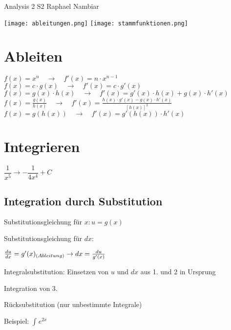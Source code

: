 



\begin{multicols*}{3}

    \DocumentInfo
    {Analysis 2 S2} %
    {Raphael Nambiar} %





    \texttt{[image: ableitungen.png]}
    \texttt{[image: stammfunktionen.png]}

    \section{ Ableiten }

    $f(x) = x^n \quad \rightarrow \quad f'(x) = n \cdot x^{n-1}$
    \WhiteSpace
    $f(x) = c \cdot g(x) \quad \rightarrow \quad f'(x) = c \cdot g'(x)$
    \WhiteSpace
    $f(x) = g(x) \cdot h(x) \quad \rightarrow \quad f'(x) = g'(x) \cdot h(x) + g(x) \cdot h'(x)$
    \WhiteSpace
    $f(x) = \frac{g(x)}{h(x)} \quad \rightarrow \quad f'(x)=\frac{h(x) \cdot g'(x) - g(x) \cdot h'(x)}{\left[h(x)\right]^2}$
    \WhiteSpace
    $f(x) = g(h(x)) \quad \rightarrow \quad f'(x) = g'(h(x)) \cdot h'(x)$

    \section{ Integrieren }
    \WhiteSpace
    {$\dfrac{1}{x^5} \rightarrow -\dfrac{1}{4x^4} + C$}
    \WhiteSpace
    \subsection{Integration durch Substitution}
    { Substitutionsgleichung für $x: u = g(x)$}

    { Substitutionsgleichung für $dx:$}

    $ \frac{du}{dx} = g'(x)_{\tiny(Ableitung)} \to dx = \frac{du}{g'(x)}$

    { Integralsubstitution: Einsetzen von $ u $ und $ dx $ aus 1. und 2 in Ursprung}

        { Integration von 3.}

        { Rücksubstitution (nur unbestimmte Integrale)}


    \begin{multicols*}{2}
        {Beispiel:}
        $\int_{}^{}e^{2x} $


\end{multicols*}
\end{multicols*}
